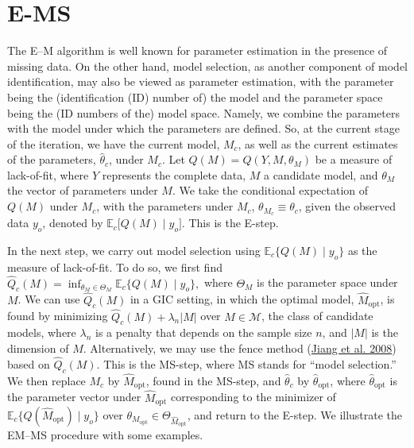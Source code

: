 \documentclass[
  12pt,
]{article}
\begin{document}
\section{E-MS}

The E--M algorithm is well known for parameter estimation in the presence of
missing data. On the other hand, model selection, as another component
of model identification, may also be viewed as parameter estimation,
with the parameter being the (identification (ID) number of) the model
and the parameter space being the (ID numbers of the) model space.
Namely, we combine the parameters with the model under which the
parameters are defined. So, at the current stage of the iteration, we
have the current model, \(M_c\), as well as the current estimates of the
parameters, \(\hat{\theta}_c\), under \(M_c\). Let
\(Q(M) = Q(Y, M, \theta_M)\) be a measure of lack-of-fit, where \(Y\)
represents the complete data, \(M\) a candidate model, and \(\theta_M\)
the vector of parameters under \(M\). We take the conditional
expectation of \(Q(M)\) under \(M_c\), with the parameters under
\(M_c\), \(\theta_{M_c} \equiv \hat{\theta_c}\), given the observed data
\(y_o\), denoted by \(\mathbb{E}_c \big[ Q(M) \mid y_o \big].\) This is
the E-step.

In the next step, we carry out model selection
using \(\mathbb{E}_c \{ Q(M) \mid y_o \}\) as the measure of lack-of-fit.
To do so, we first find
\(\hat{Q}_c(M) = \inf_{\theta_M \in \Theta_M}\mathbb{E}_c \{ Q(M) \mid y_o \},\)
where \(\Theta_M\) is the parameter space under \(M\). We can use
\(\hat{Q}_c(M)\) in a GIC setting, in which the optimal model,
\(\hat{M}_{\text{opt}}\), is found by minimizing
\(\hat{Q}_c(M) + \lambda_n |M|\) over \(M \in \mathcal{M}\), the class
of candidate models, where \(\lambda_n\) is a penalty that depends on
the sample size \(n\), and \(|M|\) is the dimension of \(M\).
Alternatively, we may use the fence method
(\protect\hyperlink{ref-Jiang_2008}{Jiang et al. 2008}) based on
\(\hat{Q}_c(M)\). This is the MS-step, where MS stands for ``model
selection.'' We then replace \(M_c\) by \(\hat{M}_{\text{opt}}\), found
in the MS-step, and \(\hat{\theta}_c\) by \(\hat{\theta}_{\text{opt}}\),
where \(\hat{\theta}_{\text{opt}}\) is the parameter vector under
\(\hat{M}_{\text{opt}}\) corresponding to the minimizer of
\(\mathbb{E}_c \{ Q(\hat{M}_{\text{opt}}) \mid y_o \}\) over
\(\theta_{M_{\text{opt}}} \in \Theta_{\hat{M}_{\text{opt}}}\), and
return to the E-step. We illustrate the EM--MS procedure with some
examples.
\end{document}
